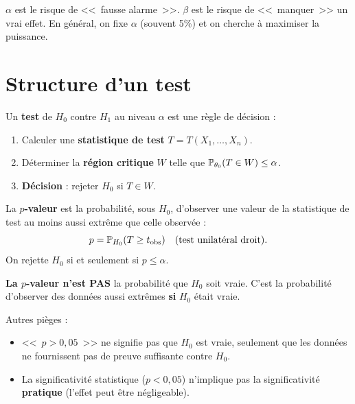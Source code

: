 \begin{intuition}
$\alpha$ est le risque de <<~fausse alarme~>>. $\beta$ est le risque de <<~manquer~>> un vrai effet. En g\'en\'eral, on fixe $\alpha$ (souvent 5\%) et on cherche \`a maximiser la puissance.
\end{intuition}

\section{Structure d'un test}

\begin{definition}
Un \textbf{test} de $H_0$ contre $H_1$ au niveau $\alpha$ est une r\`egle de d\'ecision :
\begin{enumerate}
\item Calculer une \textbf{statistique de test} $T=T(X_1,\ldots,X_n)$.
\item D\'eterminer la \textbf{r\'egion critique} $W$ telle que $\mathbb{P}_{\theta_0}(T\in W)\leq\alpha$.
\item \textbf{D\'ecision} : rejeter $H_0$ si $T\in W$.
\end{enumerate}
\end{definition}

\begin{definition}[$p$-valeur]
La \textbf{$p$-valeur} est la probabilit\'e, sous $H_0$, d'observer une valeur de la statistique de test au moins aussi extr\^eme que celle observ\'ee :
\[
p = \mathbb{P}_{H_0}(T\geq t_{\mathrm{obs}}) \quad \text{(test unilat\'eral droit)}.
\]
On rejette $H_0$ si et seulement si $p\leq\alpha$.
\end{definition}

\begin{attention}
\textbf{La $p$-valeur n'est PAS} la probabilit\'e que $H_0$ soit vraie. C'est la probabilit\'e d'observer des donn\'ees aussi extr\^emes \textbf{si} $H_0$ \'etait vraie.

Autres pi\`eges :
\begin{itemize}
\item <<~$p>0{,}05$~>> ne signifie pas que $H_0$ est vraie, seulement que les donn\'ees ne fournissent pas de preuve suffisante contre $H_0$.
\item La significativit\'e statistique ($p<0{,}05$) n'implique pas la significativit\'e \textbf{pratique} (l'effet peut \^etre n\'egligeable).
\end{itemize}
\end{attention}


